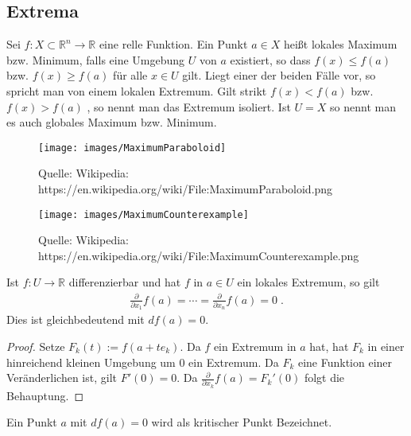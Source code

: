 \subsection{Extrema}

\begin{Definition}[Extremum]
Sei $f : X \subset \mathbb{R}^n \to \mathbb{R}$ eine relle Funktion.  Ein Punkt $a \in  X$ heißt lokales Maximum bzw. Minimum, falls eine Umgebung $U$ von $a$ existiert, so dass $f(x) \leq f(a)$ bzw.  $f(x) \geq f(a)$ für alle $x \in U$ gilt. Liegt einer der beiden Fälle vor, so spricht man von einem lokalen Extremum. Gilt strikt $f(x) <  f(a)$ bzw.  $f(x) > f(a)$ , so nennt man das Extremum isoliert. Ist $U = X$ so nennt man es auch globales Maximum bzw. Minimum.
\end{Definition}


\begin{figure}[H]
      \centering
    \texttt{[image: images/MaximumParaboloid]}
      \caption{Quelle: Wikipedia: https://en.wikipedia.org/wiki/File:MaximumParaboloid.png}
    \texttt{[image: images/MaximumCounterexample]}
      \caption{Quelle: Wikipedia: https://en.wikipedia.org/wiki/File:MaximumCounterexample.png}
\end{figure}


\begin{Satz}
 Ist $f: U  \to \mathbb{R}$ differenzierbar und hat  $f$ in $a \in U$ ein lokales Extremum, so gilt 
\begin{align*}
\frac{\partial}{\partial x_{1}}f(a)  = \cdots  = \frac{\partial}{\partial x_{n}} f(a) = 0 \;.
\end{align*}
Dies ist gleichbedeutend mit $df(a) = 0$.
\end{Satz}
\begin{proof}
Setze $F_k(t) := f(a + t e_k)$. Da $f$ ein Extremum in $a$ hat, hat $F_k$ in einer hinreichend kleinen Umgebung um $0$ ein Extremum. 
Da $F_k$ eine Funktion einer Veränderlichen ist, gilt $F'(0) = 0$. Da $\frac{\partial}{\partial x_k} f(a) = F_k'(0)$ folgt die Behauptung.
\end{proof}

\begin{Definition}
Ein Punkt $a$ mit $df(a) = 0$ wird als kritischer Punkt Bezeichnet. 
\end{Definition}

